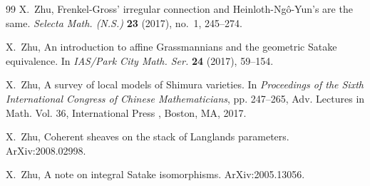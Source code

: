 \begin{thebibliography}{99}
X.~Zhu, Frenkel-Gross' irregular connection and Heinloth-Ng\^o-Yun's are the same. \emph{Selecta Math. (N.S.)} \textbf{23} (2017), no.~1, 245--274.

X.~Zhu, An introduction to affine Grassmannians and the geometric Satake equivalence. In \emph{IAS/Park City Math. Ser.} \textbf{24} (2017), 59--154.

X.~Zhu, A survey of local models of Shimura varieties. In \emph{Proceedings of the Sixth International Congress of Chinese Mathematicians}, pp. 247--265, Adv. Lectures in Math. Vol. 36, International Press , Boston, MA, 2017.

X.~Zhu, Coherent sheaves on the stack of Langlands parameters. ArXiv:2008.02998.

X.~Zhu, A note on integral Satake isomorphisms. ArXiv:2005.13056.

\end{thebibliography}
